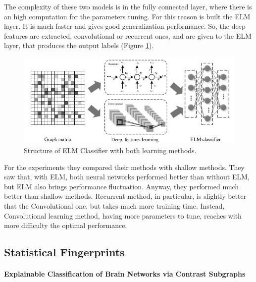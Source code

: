 The complexity of these two models is in the fully connected layer, where there is an high computation for the parameters tuning. For this reason is built the ELM layer. It is much faster and gives good generalization performance. So, the deep features are extracted, convolutional or recurrent ones, and are given to the ELM layer, that produces the output labels (Figure \ref{fig:diagram10}). 

\begin{figure}[htbp]
	\centering
	\includegraphics[scale=0.5]{Immagini/functional3.PNG}
	\caption{Structure of ELM Classifier with both learning methods.}
	\label{fig:diagram10}
\end{figure}

For the experiments they compared their methods with shallow methods. They saw that, with ELM, both neural networks performed better than without ELM, but ELM also brings performance fluctuation. Anyway, they performed much better than shallow methods. Recurrent method, in particular, is slightly better that the Convolutional one, but takes much more training time. Instead, Convolutional learning method, having more parameters to tune, reaches with more difficulty the optimal performance.

\subsection{Statistical Fingerprints}
\paragraph{Explainable Classification of Brain Networks via Contrast Subgraphs}\
\\
\label{par:1}

